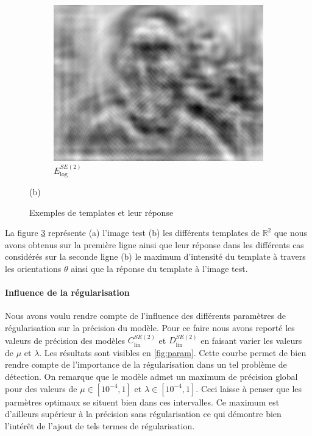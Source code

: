 \documentclass{article}
\begin{document}
\begin{figure}[h!]
\begin{subfigure}[b]{0.1\textwidth}
        \label{fig:mean and std of net44}
    \end{subfigure}
    \hspace{-1\baselineskip}
    \quad
    \begin{subfigure}[b]{0.1\textwidth}   
        \centering 
        \includegraphics[width=\textwidth]{plots/E_log_SE2_conv.jpg}
        \caption{$E_{\text{log}}^{SE(2)}$}%
        
        \label{fig:mean and std of net44}
    \end{subfigure}

    {\small (b)}

    \caption[ The average and standard deviation of critical parameters ]
    {\small Exemples de templates et leur réponse} 
    \label{fig: template}
\end{figure}

La figure \ref{fig: template} représente (a) l'image test (b) les différents templates de $\mathbb{R}^2$ que nous avons obtenus sur la première ligne ainsi que leur réponse dans les différents 
cas considérés sur la seconde ligne (b) le maximum d'intensité du template à travers les orientations $\theta$ ainsi que la réponse du template à l'image test.

\paragraph{Influence de la régularisation}

Nous avons voulu rendre compte de l'influence des différents paramètres de régularisation sur la précision du modèle.
Pour ce faire nous avons reporté les valeurs de précision des modèles $C_{\text{lin}}^{SE(2)}$ et $D_{\text{lin}}^{SE(2)}$
en faisant varier les valeurs de $\mu$ et $\lambda$. Les résultats sont visibles en \ref{fig:param}. Cette courbe permet de bien rendre 
compte de l'importance de la régularisation dans un tel problème de détection. On remarque que le modèle admet un maximum de 
précision global pour des valeurs de $\mu \in [10^{-4}, 1]$ et $\lambda \in [10^{-4}, 1]$. Ceci laisse à penser que les parmètres optimaux se situent bien 
dans ces intervalles. Ce maximum est d'ailleurs supérieur à la précision sans régularisation ce qui démontre bien l'intérêt de l'ajout de tels termes de régularisation. 
\end{document}
